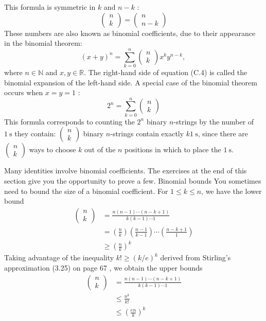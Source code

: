 \documentclass[lang=cn,newtx,10pt,scheme=chinese]{elegantbook}
\begin{document}
This formula is symmetric in $k$ and $n-k$ :
$$
\left(\begin{array}{l}
n \\
k
\end{array}\right)=\left(\begin{array}{c}
n \\
n-k
\end{array}\right)
$$
These numbers are also known as binomial coefficients, due to their appearance in the binomial theorem:
$$
(x+y)^n=\sum_{k=0}^n\left(\begin{array}{l}
n \\
k
\end{array}\right) x^k y^{n-k} \text {, }
$$
where $n \in \mathbb{N}$ and $x, y \in \mathbb{R}$. The right-hand side of equation (C.4) is called the binomial expansion of the left-hand side. A special case of the binomial theorem occurs when $x=y=1$ :
$$
2^n=\sum_{k=0}^n\left(\begin{array}{l}
n \\
k
\end{array}\right)
$$
This formula corresponds to counting the $2^n$ binary $n$-strings by the number of $1 \mathrm{~s}$ they contain: $\left(\begin{array}{l}n \\ k\end{array}\right)$ binary $n$-strings contain exactly $k 1 \mathrm{~s}$, since there are $\left(\begin{array}{l}n \\ k\end{array}\right)$ ways to choose $k$ out of the $n$ positions in which to place the $1 \mathrm{~s}$.

Many identities involve binomial coefficients. The exercises at the end of this section give you the opportunity to prove a few.
Binomial bounds
You sometimes need to bound the size of a binomial coefficient. For $1 \leq k \leq n$, we have the lower bound
$$
\begin{aligned}
\left(\begin{array}{l}
n \\
k
\end{array}\right) & =\frac{n(n-1) \cdots(n-k+1)}{k(k-1) \cdots 1} \\
& =\left(\frac{n}{k}\right)\left(\frac{n-1}{k-1}\right) \cdots\left(\frac{n-k+1}{1}\right) \\
& \geq\left(\frac{n}{k}\right)^k
\end{aligned}
$$
Taking advantage of the inequality $k ! \geq(k / e)^k$ derived from Stirling's approximation (3.25) on page 67 , we obtain the upper bounds
$$
\begin{aligned}
\left(\begin{array}{l}
n \\
k
\end{array}\right) & =\frac{n(n-1) \cdots(n-k+1)}{k(k-1) \cdots 1} \\
& \leq \frac{n^k}{k !} \\
& \leq\left(\frac{e n}{k}\right)^k
\end{aligned}
$$
\end{document}
